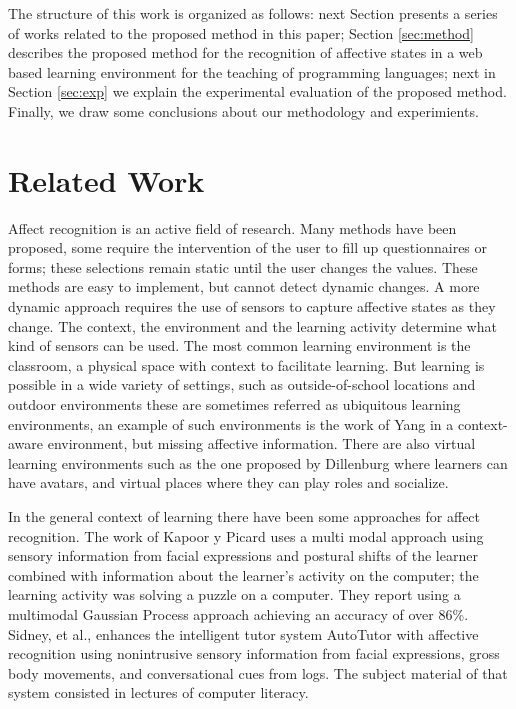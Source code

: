 \documentclass[conference]{IEEEtran}
\begin{document}
The structure of this work is organized as follows: next Section 
presents a series of works related to the proposed method in this paper; Section
\ref{sec:method} describes the proposed method for the recognition of affective
states in a web based learning environment for the teaching of programming
languages; next in Section \ref{sec:exp} we explain the experimental evaluation of the
proposed method. %
Finally, we draw some conclusions about our methodology and
experimients. 


\section{Related Work}

Affect recognition is an active field of research. Many
methods have been proposed, some require the intervention of the user to fill up
questionnaires or forms; these selections remain static until the user changes
the values. These methods are easy to implement, but cannot detect dynamic
changes.  A more dynamic approach requires the use of sensors to capture
affective states as they change. The context, the environment and the learning
activity determine what kind of sensors can be used. The most common learning
environment is the classroom, a physical space with context to facilitate
learning. But learning is possible in a wide variety of settings, such as
outside-of-school locations and outdoor environments these are sometimes
referred as ubiquitous learning environments, an example of such environments is
the work of Yang \cite{yang2006context} in a context-aware environment, but missing affective
information. There are also virtual learning environments such as the one proposed by Dillenburg
\cite{dillenbourg2002virtual}  where learners can have avatars, and virtual places
where they can play roles and socialize.

In the general context of learning there have been some approaches for affect
recognition. The work of Kapoor y Picard \cite{kapoor2005multimodal} uses a multi modal
approach using sensory information from facial expressions and postural shifts
of the learner combined with information about the learner's activity on the
computer; the learning activity was solving a puzzle on a computer. They report
using a multimodal Gaussian Process approach achieving an accuracy of over 86\%.
Sidney, et al., \cite{sidney2005integrating} enhances the intelligent tutor system AutoTutor with
affective recognition using nonintrusive sensory information from facial
expressions, gross body movements, and conversational cues from logs.  The
subject material of that system consisted in lectures of computer literacy.
\end{document}
